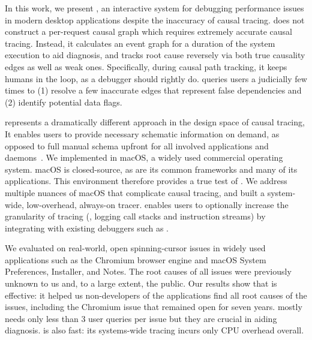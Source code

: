 In this work, we present \xxx, an interactive system for debugging performance
issues in modern desktop applications despite the inaccuracy of causal tracing.
\xxx does not construct a per-request causal graph which requires extremely
accurate causal tracing. Instead, it calculates an event graph for a duration
of the system execution to aid diagnosis, and tracks root cause reversely via
both true causality edges as well as weak ones.  Specifically, during causal
path tracking, it keeps humans in the loop, as a debugger should rightly do.
\xxx queries users a judicially few times to (1) resolve a few inaccurate edges
that represent false dependencies and (2) identify potential data flags. 

\xxx represents a dramatically different approach in the design space of causal
tracing, It enables users to provide necessary schematic information on demand,
as opposed to full manual schema upfront for all involved applications and
daemons~\cite{barham2004using, reynolds2006pip, fonseca2007x}. We implemented
\xxx in macOS, a widely used commercial operating system. macOS is
closed-source, as are its common frameworks and many of its applications.  This
environment therefore provides a true test of \xxx. We address multiple nuances
of macOS that complicate causal tracing, and built a system-wide, low-overhead,
always-on tracer. \xxx enables users to optionally increase the granularity of
tracing (\eg, logging call stacks and instruction streams) by integrating with
existing debuggers such as .

We evaluated \xxx on \nbug real-world, open spinning-cursor issues in widely
used applications such as the Chromium browser engine and macOS System
Preferences, Installer, and Notes. The root causes of all \nbug issues were
previously unknown to us and, to a large extent, the public. Our results show
that \xxx is effective: it helped us non-developers of the applications find all
root causes of the issues, including the Chromium issue that remained open for
seven years. \xxx mostly needs only less than 3 user queries per issue but they are
crucial in aiding diagnosis. \xxx is also fast: its systems-wide tracing incurs
only \cpuoverhead CPU overhead overall.


